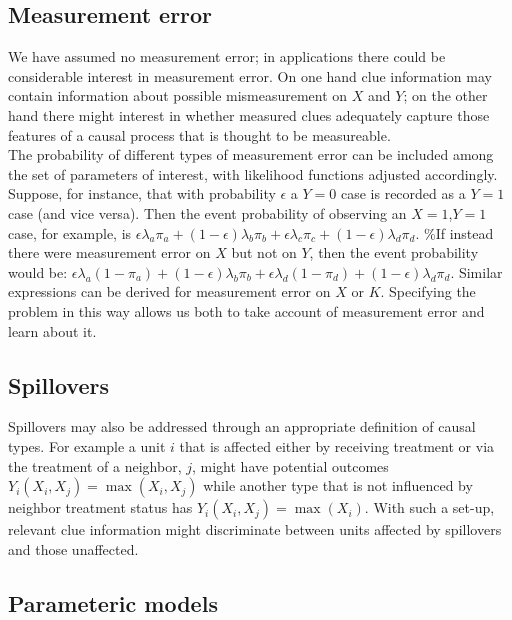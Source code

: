 \documentclass[12pt,]{book}
\begin{document}
\hypertarget{measurement-error}{%
\subsection{Measurement error}\label{measurement-error}}

We have assumed no measurement error; in applications there could be considerable interest in measurement error. On one hand clue information may contain information about possible mismeasurement on \(X\) and \(Y\); on the other hand there might interest in whether measured clues adequately capture those features of a causal process that is thought to be measureable.\\
The probability of different types of measurement error can be included among the set of parameters of interest, with likelihood functions adjusted accordingly. Suppose, for instance, that with probability \(\epsilon\) a \(Y=0\) case is recorded as a \(Y=1\) case (and vice versa). Then the event probability of observing an \(X=1\),\(Y=1\) case, for example, is \(\epsilon \lambda_a \pi_a + (1-\epsilon) \lambda_b \pi_b + \epsilon \lambda_c \pi_c + (1-\epsilon) \lambda_d \pi_d\). \%If instead there were measurement error on \(X\) but not on \(Y\), then the event probability would be: \(\epsilon \lambda_a (1-\pi_a) + (1-\epsilon) \lambda_b \pi_b + \epsilon \lambda_d (1-\pi_d) + (1-\epsilon) \lambda_d \pi_d\).
Similar expressions can be derived for measurement error on \(X\) or \(K\). Specifying the problem in this way allows us both to take account of measurement error and learn about it.

\hypertarget{spillovers}{%
\subsection{Spillovers}\label{spillovers}}

Spillovers may also be addressed through an appropriate definition of causal types. For example a unit \(i\) that is affected either by receiving treatment or via the treatment of a neighbor, \(j\), might have potential outcomes \(Y_i(X_i,X_j)=\max(X_i,X_j)\) while another type that is not influenced by neighbor treatment status has \(Y_i(X_i,X_j)=\max(X_i)\). With such a set-up, relevant clue information might discriminate between units affected by spillovers and those unaffected.

\hypertarget{parameteric-models}{%
\subsection{Parameteric models}\label{parameteric-models}}
\end{document}
